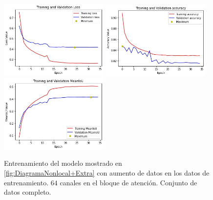 \begin{figure}[htpb]
  \centering
  \includegraphics[width=0.48\textwidth]{../../modelos-entrenados/unet-nonlocalextra-conv/ejecucion9/loss}
  \includegraphics[width=0.48\textwidth]{../../modelos-entrenados/unet-nonlocalextra-conv/ejecucion9/acc}
  \includegraphics[width=0.48\textwidth]{../../modelos-entrenados/unet-nonlocalextra-conv/ejecucion9/iou}
  \caption{Entrenamiento del modelo mostrado en \autoref{fig:DiagramaNonlocal+Extra} con aumento de datos en los datos de entrenamiento. $64$ canales en el bloque de atención. Conjunto de datos completo.}
  \label{fig:ejec9}
\end{figure}
